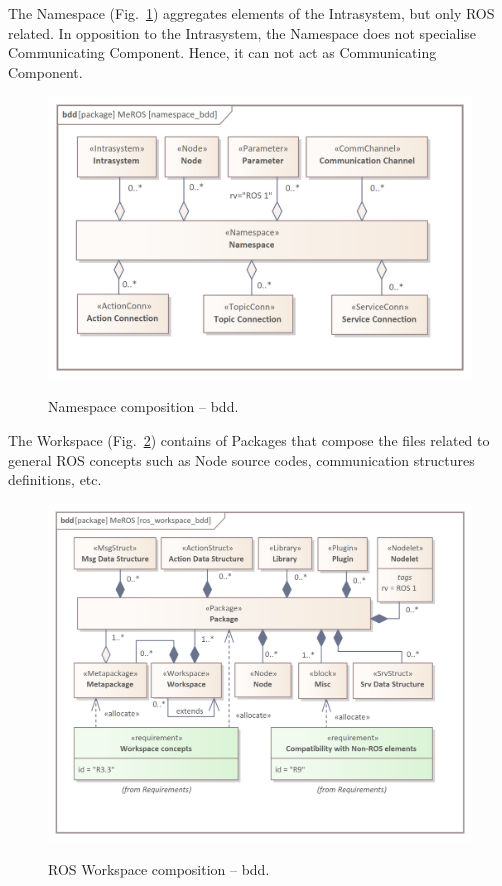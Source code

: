 \documentclass[11pt,oneside,a4paper]{article}
\begin{document}
	
	The Namespace (Fig.~\ref{fig:namespace_bdd}) aggregates elements of the Intrasystem, but only ROS related. In opposition to the Intrasystem, the Namespace does not specialise Communicating Component. Hence, it can not act as Communicating Component.
	
	
	\begin{figure}[H]
		\centering
		\begin{center}
			{\includegraphics[scale=1.0]{img/meros_pkg/namespace_bdd.png}}
		\end{center}
		\caption{Namespace composition -- bdd.} 
		\label{fig:namespace_bdd}
	\end{figure}
	
	\pagebreak
	
	
	The Workspace (Fig.~\ref{fig:ros_workspace_bdd}) contains of Packages that compose the files related to general ROS concepts such as Node source codes, communication structures definitions, etc. 
	

	\begin{figure}[H]
		\centering
		\begin{center}
			{\includegraphics[scale=1.0]{img/meros_pkg/ros_workspace_bdd.png}}
		\end{center}
		\caption{ROS Workspace composition -- bdd.} 
		\label{fig:ros_workspace_bdd}
	\end{figure}
	
\end{document}
